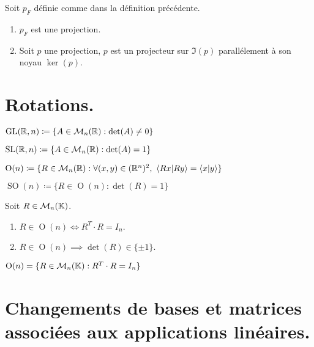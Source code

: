 \begin{proposition}
    Soit $p_F$ définie comme dans la définition précédente.
    \begin{enumerate}
        \item $p_F$ est une projection.
        \item Soit $p$ une projection, $p$ est un projecteur sur $\Im(p)$ parallélement à son noyau $\ker(p)$.
    \end{enumerate}
\end{proposition}

\section{Rotations.}
\begin{definition}
    $\operatorname{GL}(\mathbb{R}, n) \coloneqq \{ A \in \mathcal{M}_n(\mathbb{R}) : \det(A) \neq 0 \}$
\end{definition}

\begin{definition}
    $\operatorname{SL}(\mathbb{R}, n) \coloneqq \{ A \in \mathcal{M}_n(\mathbb{R}) : \det(A) = 1 \}$
\end{definition}

\begin{definition}
    $\operatorname{O}(n) \coloneqq \{ R \in \mathcal{M}_n(\mathbb{R}) : \forall (x, y) \in (\mathbb{R}^n)^2,\ \langle Rx|Ry \rangle = \langle x|y \rangle \}$
\end{definition}

\begin{definition}
    $\operatorname{SO}(n) \coloneqq \{ R \in \operatorname{O}(n) : \det(R) = 1 \}$
\end{definition}

\begin{proposition}
	Soit $R \in \mathcal{M}_n(\mathbb{K})$.
    \begin{enumerate}
        \item $R \in \operatorname{O}(n) \iff R^T \cdot R = I_n$.
        \item $R \in \operatorname{O}(n) \implies \det(R) \in \{ \pm 1 \}$.
    \end{enumerate}
\end{proposition}

\begin{corollary}
    $\operatorname{O}(n) = \{ R \in \mathcal{M}_n(\mathbb{K}) : R^T \cdot R = I_n \}$
\end{corollary}

\section{Changements de bases et matrices associées aux applications linéaires.}

